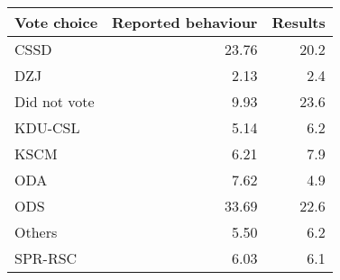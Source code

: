 
\begin{tabular}{l|r|r}
\hline
Vote choice & Reported behaviour & Results\\
\hline
CSSD & 23.76 & 20.2\\
\hline
DZJ & 2.13 & 2.4\\
\hline
Did not vote & 9.93 & 23.6\\
\hline
KDU-CSL & 5.14 & 6.2\\
\hline
KSCM & 6.21 & 7.9\\
\hline
ODA & 7.62 & 4.9\\
\hline
ODS & 33.69 & 22.6\\
\hline
Others & 5.50 & 6.2\\
\hline
SPR-RSC & 6.03 & 6.1\\
\hline
\end{tabular}
